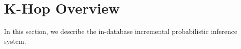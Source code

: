 
\section{K-Hop Overview}

In this section, we describe the in-database incremental probabilistic inference system.

